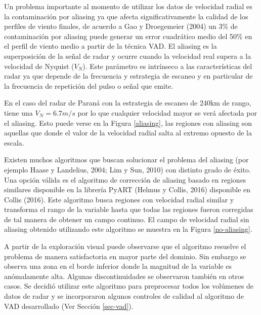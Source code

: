 \documentclass[12pt,spanish,oneside, a4paper]{book}
\begin{document}
Un problema importante al momento de utilizar los datos de velocidad
radial es la contaminación por aliasing ya que afecta significativamente
la calidad de los perfiles de viento finales, de acuerdo a Gao y
Droegemeier (2004) un 3\% de contaminación por aliasing puede generar un
error cuadrático medio del 50\% en el perfil de viento medio a partir de
la técnica VAD. El aliasing es la superposición de la señal de radar y
ocurre cuando la velocidad real supera a la velocidad de Nyquist
(\(V_N\)). Este parámetro es intrínseco a las características del radar
ya que depende de la frecuencia y estrategia de escaneo y en particular
de la frecuencia de repetición del pulso o señal que emite.

En el caso del radar de Paraná con la estrategia de escaneo de 240km de
rango, tiene una \(V_N = 6.7 m/s\) por lo que cualquier velocidad mayor
se verá afectada por el aliasing. Esto puede verse en la Figura
\ref{aliasing}, las regiones con aliasing son aquellas que donde el
valor de la velocidad radial salta al extremo opuesto de la escala.

Existen muchos algoritmos que buscan solucionar el problema del aliasing
(por ejemplo Haase y Landelius, 2004; Lim y Sun, 2010) con distinto
grado de éxito. Una opción válida es el algoritmo de corrección de
aliasing basado en regiones similares disponible en la librería PyART
(Helmus y Collis, 2016) disponible en Collis (2016). Este algoritmo
busca regiones con velocidad radial similar y transforma el rango de la
variable hasta que todas las regiones fueron corregidas de tal manera de
obtener un campo continuo. El campo de velocidad radial sin aliasing
obtenido utilizando este algoritmo se muestra en la Figura
\ref{no-aliasing}.

A partir de la exploración visual puede observarse que el algoritmo
resuelve el problema de manera satisfactoria en mayor parte del dominio.
Sin embargo se observa una zona en el borde inferior donde la magnitud
de la variable es anómalamente alta. Algunas discontinuidades se
observaron también en otros casos. Se decidió utilizar este algoritmo
para preprocesar todos los volúmenes de datos de radar y se incorporaron
algunos controles de calidad al algoritmo de VAD desarrollado (Ver
Sección \ref{sec-vad}).
\end{document}
